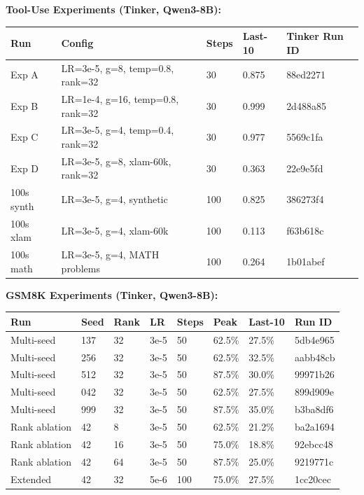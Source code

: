 \documentclass[
  american,
  11pt,
  a4paper,
  oneside]{report}
\newcounter{none} %
\begin{document}
\textbf{Tool-Use Experiments (Tinker, Qwen3-8B):}

{\def\LTcaptype{none} %
\begin{longtable}[]{@{}lllll@{}}
\toprule\noalign{}
Run & Config & Steps & Last-10 & Tinker Run ID \\
\midrule\noalign{}
\endhead
\bottomrule\noalign{}
\endlastfoot
Exp A & LR=3e-5, g=8, temp=0.8, rank=32 & 30 & 0.875 & 88ed2271 \\
Exp B & LR=1e-4, g=16, temp=0.8, rank=32 & 30 & 0.999 & 2d488a85 \\
Exp C & LR=3e-5, g=4, temp=0.4, rank=32 & 30 & 0.977 & 5569c1fa \\
Exp D & LR=3e-5, g=8, xlam-60k, rank=32 & 30 & 0.363 & 22e9e5fd \\
100s synth & LR=3e-5, g=4, synthetic & 100 & 0.825 & 386273f4 \\
100s xlam & LR=3e-5, g=4, xlam-60k & 100 & 0.113 & f63b618c \\
100s math & LR=3e-5, g=4, MATH problems & 100 & 0.264 & 1b01abef \\
\end{longtable}
}

\textbf{GSM8K Experiments (Tinker, Qwen3-8B):}

{\def\LTcaptype{none} %
\begin{longtable}[]{@{}llllllll@{}}
\toprule\noalign{}
Run & Seed & Rank & LR & Steps & Peak & Last-10 & Run ID \\
\midrule\noalign{}
\endhead
\bottomrule\noalign{}
\endlastfoot
Multi-seed & 137 & 32 & 3e-5 & 50 & 62.5\% & 27.5\% & 5db4e965 \\
Multi-seed & 256 & 32 & 3e-5 & 50 & 62.5\% & 32.5\% & aabb48cb \\
Multi-seed & 512 & 32 & 3e-5 & 50 & 87.5\% & 30.0\% & 99971b26 \\
Multi-seed & 042 & 32 & 3e-5 & 50 & 62.5\% & 27.5\% & 899d909e \\
Multi-seed & 999 & 32 & 3e-5 & 50 & 87.5\% & 35.0\% & b3ba8df6 \\
Rank ablation & 42 & 8 & 3e-5 & 50 & 62.5\% & 21.2\% & ba2a1694 \\
Rank ablation & 42 & 16 & 3e-5 & 50 & 75.0\% & 18.8\% & 92ebcc48 \\
Rank ablation & 42 & 64 & 3e-5 & 50 & 87.5\% & 25.0\% & 9219771c \\
Extended & 42 & 32 & 5e-6 & 100 & 75.0\% & 27.5\% & 1cc20cec \\
\end{longtable}
}
\end{document}
